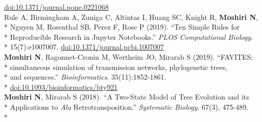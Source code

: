 \documentclass[margin,line]{res}
\begin{document}
\begin{resume}
\hspace*{8mm} \href{https://doi.org/10.1371/journal.pone.0221068}{doi:10.1371/journal.pone.0221068}\\
\hspace*{4mm} Rule A, Birmingham A, Zuniga C, Altintas I, Huang SC, Knight R, \textbf{Moshiri N},\\*
\hspace*{9mm} Nguyen M, Rosenthal SB, Perez F, Rose P (2019). ``Ten Simple Rules for\\*
\hspace*{9mm} Reproducible Research in Jupyter Notebooks.'' \textit{PLOS Computational Biology}.\\*\vspace{2mm}
\hspace*{8mm} 15(7):e1007007. \href{https://doi.org/10.1371/journal.pcbi.1007007}{doi:10.1371/journal.pcbi.1007007}\\
\hspace*{4mm} \textbf{Moshiri N}, Ragonnet-Cronin M, Wertheim JO, Mirarab S (2019). ``FAVITES:\\*
\hspace*{9mm} simultaneous simulation of transmission networks, phylogenetic trees,\\*
\hspace*{9mm} and sequences.'' \textit{Bioinformatics}. 35(11):1852-1861.\\*\vspace{2mm}
\hspace*{8mm} \href{https://doi.org/10.1093/bioinformatics/bty921}{doi:10.1093/bioinformatics/bty921}\\
\hspace*{4mm} \textbf{Moshiri N}, Mirarab S (2018). ``A Two-State Model of Tree Evolution and its\\*
\hspace*{9mm} Applications to \textit{Alu} Retrotransposition.'' \textit{Systematic Biology}. 67(3), 475-489.\\*\vspace{2mm}

\end{resume}
\end{document}
